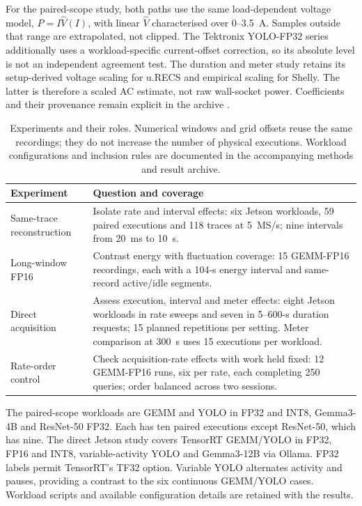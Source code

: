 \documentclass[a4paper,UKenglish,cleveref,autoref]{oasics-v2021}
\newcommand{\urecs}{u.RECS}
\begin{document}
For the paired-scope study, both paths use the same load-dependent voltage model, $\widehat P=I\widehat V(I)$, with linear $\widehat V$ characterised over 0--3.5~A. Samples outside that range are extrapolated, not clipped. The Tektronix YOLO-FP32 series additionally uses a workload-specific current-offset correction, so its absolute level is not an independent agreement test. The duration and meter study retains its setup-derived voltage scaling for \urecs{} and empirical scaling for Shelly. The latter is therefore a scaled AC estimate, not raw wall-socket power. Coefficients and their provenance remain explicit in the archive \cite{energyResults2026}.

\begin{table}[htbp]
\centering\small
\caption{Experiments and their roles. Numerical windows and grid offsets reuse the same recordings; they do not increase the number of physical executions. Workload configurations and inclusion rules are documented in the accompanying methods and result archive.}
\label{tab:workloads}
\begin{tabularx}{\textwidth}{@{}L{.22\textwidth}Y@{}}
\toprule
Experiment & Question and coverage \\
\midrule
Same-trace reconstruction & Isolate rate and interval effects: six Jetson workloads, 59 paired executions and 118 traces at 5~MS/s; nine intervals from 20~ms to 10~s. \\
Long-window FP16 & Contrast energy with fluctuation coverage: 15 GEMM-FP16 recordings, each with a 104-s energy interval and same-record active/idle segments. \\
Direct acquisition & Assess execution, interval and meter effects: eight Jetson workloads in rate sweeps and seven in 5--600-s duration requests; 15 planned repetitions per setting. Meter comparison at 300~s uses 15 executions per workload. \\
Rate-order control & Check acquisition-rate effects with work held fixed: 12 GEMM-FP16 runs, six per rate, each completing 250 queries; order balanced across two sessions. \\
\bottomrule
\end{tabularx}
\end{table}

The paired-scope workloads are GEMM and YOLO in FP32 and INT8, Gemma3-4B and ResNet-50 FP32. Each has ten paired executions except ResNet-50, which has nine. The direct Jetson study covers TensorRT GEMM/YOLO in FP32, FP16 and INT8, variable-activity YOLO and Gemma3-12B via Ollama. FP32 labels permit TensorRT's TF32 option. Variable YOLO alternates activity and pauses, providing a contrast to the six continuous GEMM/YOLO cases. Workload scripts and available configuration details are retained with the results.
\end{document}
